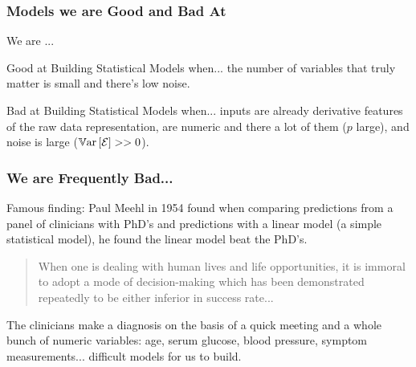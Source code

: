 \documentclass[slides]{beamer} %
\begin{document}

\begin{frame}\frametitle{Models we are Good and Bad At}
\small

We are ...

\begin{block}{Good at Building Statistical Models when...} \pause 
the number of variables that truly matter is small and there's low noise. %
\end{block}
	
\begin{block}{Bad at Building Statistical Models when...} \pause 
inputs are already derivative features of the raw data representation, are numeric and there a lot of them ($p$ large), and noise is large ($\mathbb{V}\text{ar}\left[\mathcal{E}\right] >> 0$). %
\end{block}


\end{frame}

\begin{frame}\frametitle{We are Frequently Bad...}

Famous finding: Paul Meehl in 1954 found when comparing predictions from a panel of clinicians with PhD's and predictions with a linear model (a simple statistical model),  \pause he found the linear model beat the PhD's.


\begin{quotation}\footnotesize
When one is dealing with human lives and life opportunities, it is immoral to adopt a mode of decision-making which has been demonstrated repeatedly to be either inferior in success rate...
\end{quotation} \pause 

The clinicians make a diagnosis on the basis of a quick meeting and a whole bunch of numeric variables: age, serum glucose, blood pressure, symptom measurements... difficult models for us to build.

\end{frame}
\end{document}
